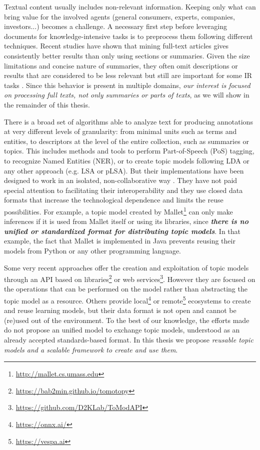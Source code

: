 Textual content usually includes non-relevant information. Keeping only what can bring value for the involved agents (general consumers, experts, companies, investors...) becomes a challenge. A necessary first step before leveraging documents for knowledge-intensive tasks is to preprocess them following different techniques. Recent studies \citep{Westergaard2017} have shown that mining full-text articles gives consistently better results than only using sections or summaries. Given the size limitations and concise nature of summaries, they often omit descriptions or results that are considered to be less relevant but still are important for some IR tasks \citep{Divoli2012}.  Since this behavior is present in multiple domains, \textit{our interest is focused on processing full texts, not only summaries or parts of texts}, as we will show in the remainder of this thesis.

There is a broad set of algorithms able to analyze text for producing annotations at very different levels of granularity: from minimal units such as terms and entities, to descriptors at the level of the entire collection, such as summaries or topics. This includes methods and tools to perform Part-of-Speech (PoS) tagging, to recognize Named Entities (NER), or to create topic models following LDA or any other approach (e.g. LSA or pLSA). But their implementations have been designed to work in an isolated, non-collaborative way \citep{Manning2014TheToolkit, Agerri2014}. They have not paid special attention to facilitating their interoperability and they use closed data formats that increase the technological dependence and limits the reuse possibilities. For example, a topic model created by Mallet\footnote{\url{http://mallet.cs.umass.edu}} can only make inferences if it is used from Mallet itself or using its libraries, since \textbf{\textit{there is no unified or standardized format for distributing topic models}}. In that example, the fact that Mallet is implemented in Java prevents reusing their models from Python or any other programming language.

Some very recent approaches offer the creation and exploitation of topic models through an API based on libraries\footnote{\url{https://bab2min.github.io/tomotopy}} or web services\footnote{\url{https://github.com/D2KLab/ToModAPI}}\citep{Lisena:NLPOSS2020}. However they are focused on the operations that can be performed on the model rather than abstracting the topic model as a resource. Others provide local\footnote{\url{https://onnx.ai/}} or remote\footnote{\url{https://vespa.ai}} ecosystems to create and reuse learning models, but their data format is not open and cannot be (re)used out of the environment. To the best of our knowledge, the efforts made do not propose an unified model to exchange topic models, understood as an already accepted standards-based format. In this thesis we propose \textit{reusable topic models and a scalable framework to create and use them}.  
 

